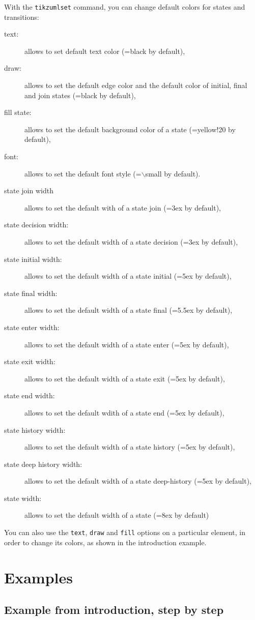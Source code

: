 \documentclass[a4paper,11pt]{report}
\begin{document}
With the {\tt tikzumlset} command, you can change default colors for states and transitions:

\begin{description}
\item[text:] allows to set default text color (=black by default),
\item[draw:] allows to set the default edge color and the default color of initial, final and join states (=black by default),
\item[fill state:] allows to set the default background color of a state (=yellow!20 by default),
\item[font:] allows to set the default font style (=$\backslash$small by default).
\item[state join width] allows to set the default with of a state join (=3ex by default),
\item[state decision width:] allows to set the default width of a state decision (=3ex by default),
\item[state initial width:] allows to set the default width of a state initial (=5ex by default),
\item[state final width:] allows to set the default width of a state final (=5.5ex by default),
\item[state enter width:] allows to set the default width of a state enter (=5ex by default),
\item[state exit width:] allows to set the default width of a state exit (=5ex by default),
\item[state end width:] allows to set the default wdith of a state end (=5ex by default),
\item[state history width:] allows to set the default width of a state history (=5ex by default),
\item[state deep history width:] allows to set the default width of a state deep-history (=5ex by default),
\item[state width:] allows to set the default width of a state (=8ex by default)
\end{description}

You can also use the {\tt text}, {\tt draw} and {\tt fill} options on a particular element, in order to change its colors, as shown in the introduction example.

\section{Examples}

\subsection{Example from introduction, step by step}
\end{document}
